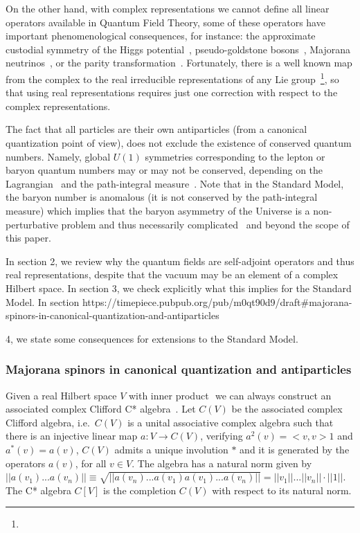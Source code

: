 \documentclass[11pt]{book}
\begin{document}
On the other hand, with complex representations we cannot define all
linear operators available in Quantum Field Theory, some of these
operators have important phenomenological consequences, for instance:
the approximate custodial symmetry of the Higgs
potential~\cite{Olive2014Review}\cite{Pich2016Electroweak}\cite{Pilaftsis2012On},
pseudo-goldstone
bosons~\cite{Pilaftsis2012On},
Majorana neutrinos~\cite{Sun2016Majorana}, or the parity
transformation~\cite{Lee1966Space}. Fortunately, there is a well known map from the complex to the
real irreducible representations of any Lie group~\footnote{}, so that
using real representations requires just one correction with respect to
the complex representations.

The fact that all particles are their own antiparticles (from a
canonical quantization point of view), does not exclude the existence of
conserved quantum numbers. Namely, global \(U(1)\) symmetries
corresponding to the lepton or baryon quantum numbers may or may not be
conserved, depending on the
Lagrangian~\cite{Valle2015Neutrinos} and the path-integral
measure~\cite{Kuzmin1985On}.
Note that in the Standard Model, the baryon number is anomalous (it is
not conserved by the path-integral measure) which implies that the
baryon asymmetry of the Universe is a non-perturbative problem and thus
necessarily complicated~\cite{Kuzmin1985On} and beyond the scope of this paper.

In section 2, we review why the quantum fields are self-adjoint
operators and thus real representations, despite that the vacuum may be
an element of a complex Hilbert space. In section 3, we check explicitly
what this implies for the Standard Model. In section
\protect\hyperlink{null}{}https://timepiece.pubpub.org/pub/m0qt90d9/draft\#majorana-spinors-in-canonical-quantization-and-antiparticles

\cite{Kuzmin1985On}

4, we state some consequences for extensions to the Standard Model.

\hypertarget{majorana-spinors-in-canonical-quantization-and-antiparticles}{%
\subsubsection{Majorana spinors in canonical quantization and
antiparticles}\label{majorana-spinors-in-canonical-quantization-and-antiparticles}}

Given a real Hilbert space \(V\) with inner product \(<,>\) we can
always construct an associated complex Clifford C*
algebra~\cite{Plymen1994Spinors}. Let \(C(V)\) be the associated complex Clifford algebra,
i.e.~\(C(V)\) is a unital associative complex algebra such that there is
an injective linear map \(a:V\to C(V)\), verifying \(a^2(v)=<v,v>1\) and
\(a^*(v)=a(v)\), \(C(V)\) admits a unique involution \(*\) and it is
generated by the operators \(a(v)\), for all \(v\in V\). The algebra has
a natural norm given by
\(||a(v_1)...a(v_n)||\equiv \sqrt{||a(v_n)...a(v_1)a(v_1)...a(v_n)||}=||v_1||...||v_n||\cdot||1||\).
The C* algebra \(C[V]\) is the completion \(C(V)\) with respect to its
natural norm.
\end{document}
